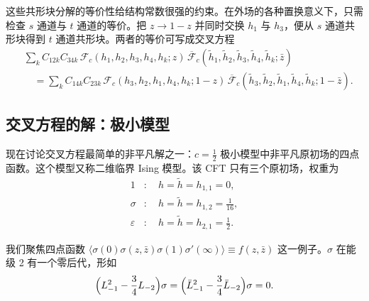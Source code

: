 
这些共形块分解的等价性给结构常数很强的约束。在外场的各种置换意义下，只需检查 $s$ 通道与 $t$ 通道的等价。把 $z\to1-z$ 并同时交换 $h_1$ 与 $h_3$，便从 $s$ 通道共形块得到 $t$ 通道共形块。两者的等价可写成交叉方程
\begin{equation}\label{eq:3-34}
  \begin{aligned}
  &\sum_k C_{12k}C_{34k}\,
  \mathcal{F}_c(h_1,h_2,h_3,h_4,h_k;z)\,
  \overline{\mathcal{F}}_c(\tilde h_1,\tilde h_2,\tilde h_3,\tilde h_4,\tilde h_k;\bar z)\\
  &\quad=\sum_k C_{14k}C_{23k}\,
  \mathcal{F}_c(h_3,h_2,h_1,h_4,h_k;1-z)\,
  \overline{\mathcal{F}}_c(\tilde h_3,\tilde h_2,\tilde h_1,\tilde h_4,\tilde h_k;1-\bar z).
  \end{aligned}
\end{equation}


\subsection{交叉方程的解：极小模型}

现在讨论交叉方程最简单的非平凡解之一：$c=\frac12$ 极小模型中非平凡原初场的四点函数。这个模型又称二维临界 Ising 模型。该 CFT 只有三个原初场，权重为
\begin{equation}\label{eq:3-35}
  \begin{aligned}
  1&:\quad h=\tilde h=h_{1,1}=0,\\
  \sigma&:\quad h=\tilde h=h_{1,2}=\frac{1}{16},\\
  \varepsilon&:\quad h=\tilde h=h_{2,1}=\frac12 .
  \end{aligned}
\end{equation}

我们聚焦四点函数 $\langle\sigma(0)\sigma(z,\bar z)\sigma(1)\sigma'(\infty)\rangle\equiv f(z,\bar z)$ 这一例子。$\sigma$ 在能级 2 有一个零后代，形如
\begin{equation}\label{eq:3-36}
  \Bigl(L_{-1}^2-\frac34L_{-2}\Bigr)\sigma
  =\Bigl(\bar L_{-1}^2-\frac34\bar L_{-2}\Bigr)\sigma=0 .
\end{equation}

